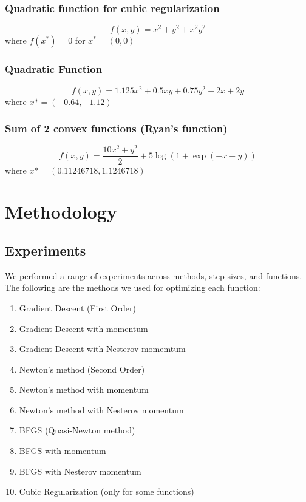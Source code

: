 \documentclass{article}
\begin{document}
\subsubsection{Quadratic function for cubic regularization}
\begin{equation}
f(x,y) = x^2 +y^2 + x^2y^2
\end{equation}
where $f(x^*) = 0$ for $x^* = (0,0)$

\subsubsection{Quadratic Function}
\begin{equation}
f(x,y) = 1.125x^2 + 0.5xy + 0.75y^2 + 2x + 2y
\end{equation}
where $x* = (-0.64,-1.12)$

\subsubsection{Sum of 2 convex functions (Ryan's function)}
\begin{equation}
f(x,y) = \frac{10x^2 + y^2}{2} + 5\log(1+\exp(-x-y))
\end{equation}
where $x* = (0.11246718,1.1246718)$



\section{Methodology}\label{experiments}

\subsection{Experiments}
We performed a range of experiments across methods, step sizes, and functions. The following are the methods we used for optimizing each function:
\begin{enumerate}
	\item Gradient Descent (First Order)
	\item Gradient Descent with momentum
	\item Gradient Descent with Nesterov momemtum
	\item Newton's method (Second Order)
	\item Newton's method with momentum 
	\item Newton's method with Nesterov momentum
	\item BFGS (Quasi-Newton method)
	\item BFGS with momentum
	\item BFGS with Nesterov momentum
	\item Cubic Regularization (only for some functions)
\end{enumerate}
\end{document}
